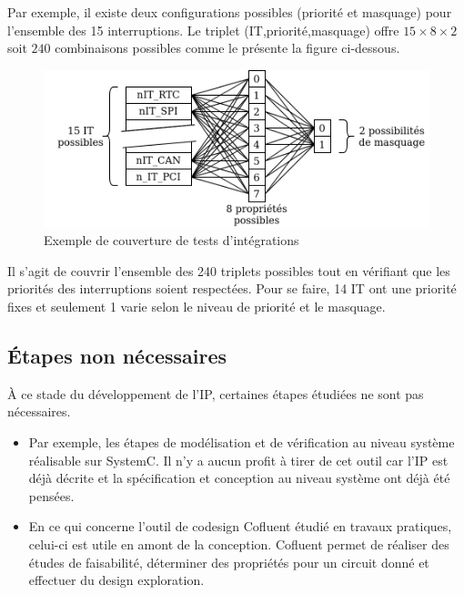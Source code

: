 Par exemple, il existe deux configurations possibles (priorité et masquage) pour l'ensemble des 15 interruptions.
Le triplet (IT,priorité,masquage) offre $15\times8\times2$ soit $240$ combinaisons possibles comme le présente la figure ci-dessous.

\begin{figure}[h!]
	\centering
	\includegraphics[width=0.7\linewidth]{figure/combinaisons_integration.png}
	\caption{Exemple de couverture de tests d'intégrations}
	\label{fig:combinaisons_integration}
\end{figure}

Il s'agit de couvrir l'ensemble des 240 triplets possibles tout en vérifiant que les priorités des interruptions soient respectées. Pour se faire, 14 IT ont une priorité fixes et seulement 1 varie selon le niveau de priorité et le masquage.

\subsection{Étapes non nécessaires}

À ce stade du développement de l'IP, certaines étapes étudiées ne sont pas nécessaires.

\begin{itemize}
	\item Par exemple, les étapes de modélisation et de vérification au niveau système réalisable sur SystemC.
	Il n'y a aucun profit à tirer de cet outil car l'IP est déjà décrite et la spécification et conception au niveau système ont déjà été pensées.
	\item En ce qui concerne l'outil de codesign Cofluent étudié en travaux pratiques, celui-ci est utile en amont de la conception.
	Cofluent permet de réaliser des études de faisabilité, déterminer des propriétés pour un circuit donné et effectuer du design exploration.
\end{itemize}


